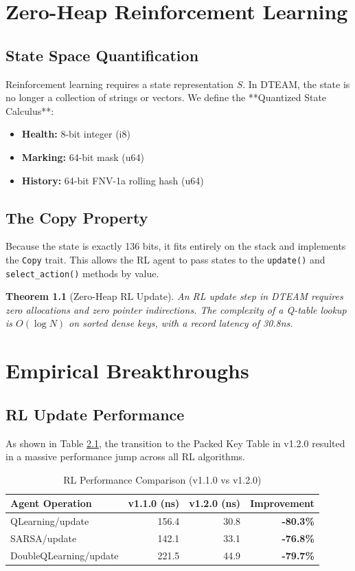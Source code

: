 \documentclass[12pt,a4paper]{report}
\newtheorem{theorem}{Theorem}
\begin{document}
\chapter{Zero-Heap Reinforcement Learning}
\section{State Space Quantification}
Reinforcement learning requires a state representation $S$. In DTEAM, the state is no longer a collection of strings or vectors. We define the **Quantized State Calculus**:
\begin{itemize}
    \item \textbf{Health:} 8-bit integer (i8)
    \item \textbf{Marking:} 64-bit mask (u64)
    \item \textbf{History:} 64-bit FNV-1a rolling hash (u64)
\end{itemize}

\section{The Copy Property}
Because the state is exactly 136 bits, it fits entirely on the stack and implements the \texttt{Copy} trait. This allows the RL agent to pass states to the \texttt{update()} and \texttt{select\_action()} methods by value.
\begin{theorem}[Zero-Heap RL Update]
An RL update step in DTEAM requires zero allocations and zero pointer indirections. The complexity of a Q-table lookup is $O(\log N)$ on sorted dense keys, with a record latency of 30.8ns.
\end{theorem}

\chapter{Empirical Breakthroughs}
\section{RL Update Performance}
As shown in Table \ref{tab:rl_bench}, the transition to the Packed Key Table in v1.2.0 resulted in a massive performance jump across all RL algorithms.

\begin{table}[ht]
\centering
\caption{RL Performance Comparison (v1.1.0 vs v1.2.0)}
\label{tab:rl_bench}
\begin{tabular}{lrrr}
\toprule
Agent Operation & v1.1.0 (ns) & v1.2.0 (ns) & Improvement \\
\midrule
QLearning/update & 156.4 & 30.8 & \textbf{-80.3\%} \\
SARSA/update & 142.1 & 33.1 & \textbf{-76.8\%} \\
DoubleQLearning/update & 221.5 & 44.9 & \textbf{-79.7\%} \\
\bottomrule
\end{tabular}
\end{table}
\end{document}
